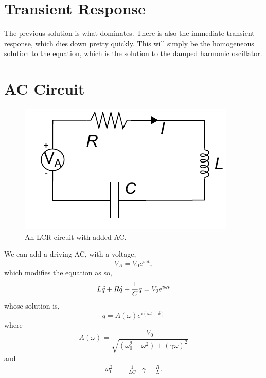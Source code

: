 \documentclass{book}
\begin{document}
\section{Transient Response}
The previous solution is what dominates. There is also the immediate transient response, which dies down pretty quickly. This will simply be the homogeneous solution to the equation, which is the solution to the damped harmonic oscillator.
\section{AC Circuit}
\begin{figure}[h]
    \centering
    \includegraphics{RLC_driven.pdf}
    \caption{An LCR circuit with added AC.}
    \label{fig:AC}
\end{figure}
We can add a driving AC, with a voltage,
\begin{equation}
    V_A = V_0e^{i\omega t},
\end{equation}
which modifies the equation as so,
\begin{equation}
    L\Ddot{q} + R \Dot{q} + \frac{1}{C}q = V_0e^{i\omega t}
\end{equation}
whose solution is,
\begin{equation}
    q = A(\omega)e^{i(\omega t - \delta)}
\end{equation}
where
\begin{equation}
    A(\omega) = \frac{V_0}{\sqrt{(\omega_0^2-\omega^2)+ (\gamma\omega)^2}}
\end{equation}
and
\begin{align}
    \omega_0^2 &= \frac{1}{LC} & \gamma = \frac{R}{L}.
\end{align}
\end{document}
